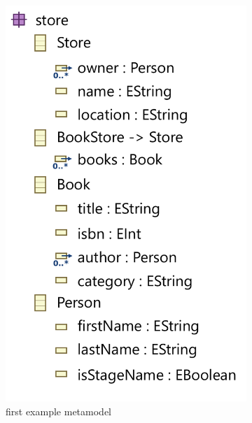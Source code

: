 \begin{figure}
    \centering
    \begin{subfigure}{.45\linewidth}
        \centering\captionsetup{width=.99\linewidth}%
        \includegraphics[width=.90\textwidth]{figures/mde/emfTreeView.pdf}
        \caption{first example metamodel}
        \label{fig:tokenization:sub1}
    \end{subfigure}%
    \begin{subfigure}{.45\linewidth}
          \centering\captionsetup{width=.99\linewidth}%

\end{subfigure}
\end{figure}
